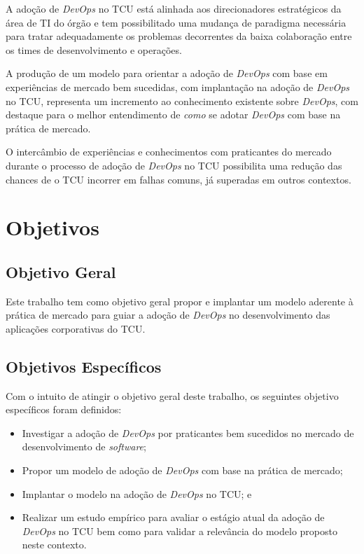 A adoção de \textit{DevOps} no \acrshort{TCU} está alinhada aos direcionadores
estratégicos da área de \acrshort{TI} do órgão e tem possibilitado uma
mudança de paradigma necessária para tratar adequadamente os problemas
decorrentes da baixa colaboração entre os times de desenvolvimento e operações.

A produção de um modelo para orientar a adoção de \textit{DevOps} com base em
experiências de mercado bem sucedidas, com implantação na adoção de
\textit{DevOps} no \acrshort{TCU}, representa um
incremento ao conhecimento existente sobre \textit{DevOps}, com destaque
para o melhor entendimento de \emph{como} se adotar \textit{DevOps} com base na
prática de mercado.

O intercâmbio de experiências e conhecimentos com praticantes do mercado
durante o processo de adoção de \textit{DevOps} no TCU possibilita uma redução
das chances de o \acrshort{TCU} incorrer em falhas comuns, já superadas em
outros contextos.

\section{Objetivos}

\subsection{Objetivo Geral}

Este trabalho tem como objetivo geral propor e implantar um modelo aderente à prática
de mercado para guiar a adoção de \textit{DevOps} no desenvolvimento das
aplicações corporativas do \acrshort{TCU}.

\subsection{Objetivos Específicos}
Com o intuito de atingir o objetivo geral deste trabalho, os seguintes objetivo
específicos foram definidos:

\begin{itemize}
\item Investigar a adoção de \textit{DevOps} por praticantes bem sucedidos no
mercado de desenvolvimento de \textit{software};
\item Propor um modelo de adoção de \textit{DevOps} com base na prática de mercado;
\item Implantar o modelo na adoção de \textit{DevOps} no \acrshort{TCU}; e
\item Realizar um estudo empírico para avaliar o estágio atual da adoção de
\textit{DevOps} no \acrshort{TCU} bem como para validar a relevância do modelo
proposto neste contexto.
\end{itemize}

